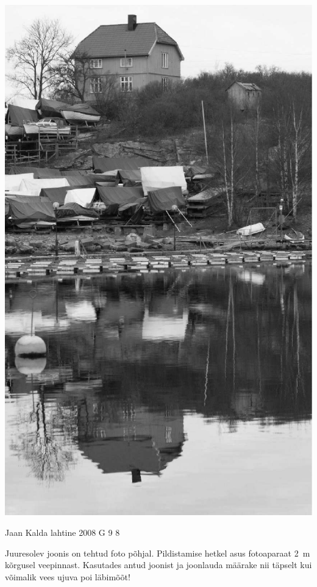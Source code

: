 \documentclass[11pt, twoside]{article}
\begin{document}
{{\begin{center}
	\includegraphics[height=\textheight]{2008-v3g-04-yl}
\end{center}
\fi
}

{Jaan Kalda} %
{lahtine} %
{2008} %
{G 9} %
{8} %
{
\ifStatement
Juuresolev joonis on tehtud foto põhjal. Pildistamise hetkel asus fotoaparaat \SI{2}{m} kõrgusel veepinnast. Kasutades antud joonist ja joonlauda määrake nii täpselt kui võimalik vees ujuva poi läbimõõt!

}}
\end{document}
